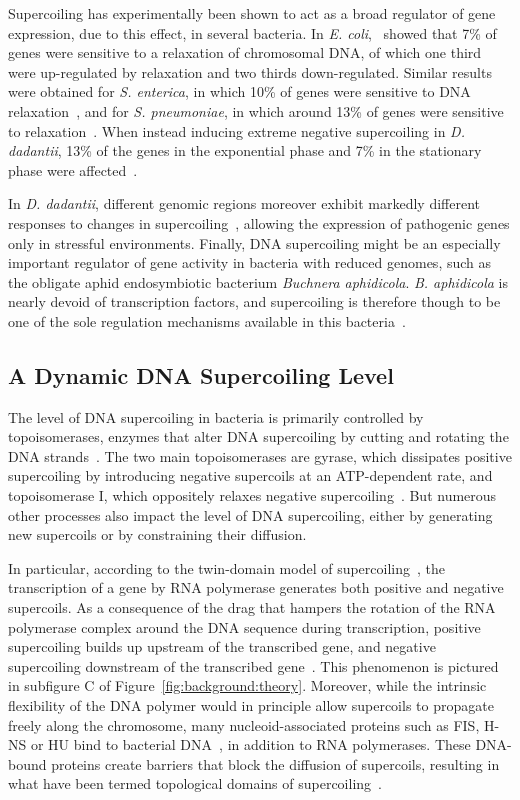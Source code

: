 Supercoiling has experimentally been shown to act as a broad regulator of gene expression, due to this effect, in several bacteria.
In \emph{E. coli},~\cite{peter2004} showed that 7\% of genes were sensitive to a relaxation of chromosomal DNA, of which one third were up-regulated by relaxation and two thirds down-regulated.
Similar results were obtained for \emph{S. enterica}, in which 10\% of genes were sensitive to DNA relaxation~\citep{webber2013}, and for \emph{S. pneumoniae}, in which around 13\% of genes were sensitive to relaxation~\citep{ferrandiz2010}.
When instead inducing extreme negative supercoiling in \emph{D. dadantii}, 13\% of the genes in the exponential phase and 7\% in the stationary phase were affected~\citep{pineau2022a}.

In \emph{D. dadantii}, different genomic regions moreover exhibit markedly different responses to changes in supercoiling~\citep{muskhelishvili2019}, allowing the expression of pathogenic genes only in stressful environments.
Finally, DNA supercoiling might be an especially important regulator of gene activity in bacteria with reduced genomes, such as the obligate aphid endosymbiotic bacterium \emph{Buchnera aphidicola}.
\emph{B. aphidicola} is nearly devoid of transcription factors, and supercoiling is therefore though to be one of the sole regulation mechanisms available in this bacteria~\citep{brinza2013}.

\subsection{A Dynamic DNA Supercoiling Level}

The level of DNA supercoiling in bacteria is primarily controlled by topoisomerases, enzymes that alter DNA supercoiling by cutting and rotating the DNA strands~\citep{duprey2021}.
The two main topoisomerases are gyrase, which dissipates positive supercoiling by introducing negative supercoils at an ATP-dependent rate, and topoisomerase I, which oppositely relaxes negative supercoiling~\citep{martisb.2019}.
But numerous other processes also impact the level of DNA supercoiling, either by generating new supercoils or by constraining their diffusion.

In particular, according to the twin-domain model of supercoiling~\citep{liu1987}, the transcription of a gene by RNA polymerase generates both positive and negative supercoils.
As a consequence of the drag that hampers the rotation of the RNA polymerase complex around the DNA sequence during transcription, positive supercoiling builds up upstream of the transcribed gene, and negative supercoiling downstream of the transcribed gene~\citep{visser2022}.
This phenomenon is pictured in subfigure C of Figure~\ref{fig:background:theory}.
Moreover, while the intrinsic flexibility of the DNA polymer would in principle allow supercoils to propagate freely along the chromosome, many nucleoid-associated proteins such as FIS, H-NS or HU bind to bacterial DNA~\citep{krogh2018}, in addition to RNA polymerases.
These DNA-bound proteins create barriers that block the diffusion of supercoils, resulting in what have been termed topological domains of supercoiling~\citep{postow2004}.


